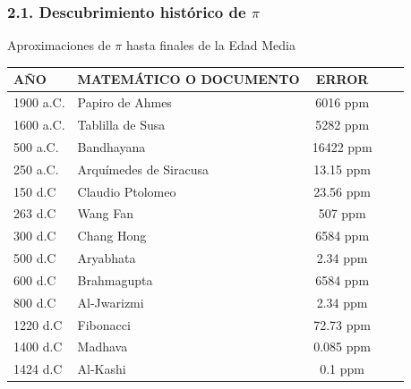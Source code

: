 \documentclass{beamer}
\begin{document}
\begin{frame}
\frametitle{2.1. Descubrimiento histórico de $\pi$}
\begin{block}{Aproximaciones de $\pi$ hasta finales de la Edad Media}

\begin{table}[!ht]
\begin{center}
\begin{tabular}{|l|l|c|c|r|}
\hline
\textbf{AÑO} & \textbf{MATEMÁTICO O DOCUMENTO}   & \textbf{ERROR}  \\ \hline
1900 a.C.    & Papiro de Ahmes                   & 6016 ppm        \\ \hline
1600 a.C.    & Tablilla de Susa                  & 5282 ppm        \\ \hline
500 a.C.     & Bandhayana                        & 16422 ppm       \\ \hline
250 a.C.     & Arquímedes de Siracusa            & 13.15 ppm       \\ \hline
150 d.C      & Claudio Ptolomeo                  & 23.56 ppm       \\ \hline
263 d.C      & Wang Fan                          & 507 ppm         \\ \hline
300 d.C      & Chang Hong                        & 6584 ppm        \\ \hline
500 d.C      & Aryabhata                         & 2.34 ppm        \\ \hline
600 d.C      & Brahmagupta                       & 6584 ppm        \\ \hline
800 d.C      & Al-Jwarizmi                       & 2.34 ppm        \\ \hline
1220 d.C     & Fibonacci                         & 72.73 ppm       \\ \hline
1400 d.C     & Madhava                           & 0.085 ppm       \\ \hline
1424 d.C     & Al-Kashi                          & 0.1 ppm         \\ \hline

\end{tabular}
\end{center}
\label{history}
\end{table}

\end{block}
\end{frame}

\end{document}
